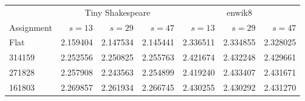\begin{tabular}{lrrr|rrr}
\toprule
 & \multicolumn{3}{c|}{Tiny Shakespeare} & \multicolumn{3}{c}{enwik8} \\
Assignment & $s=13$ & $s=29$ & $s=47$ & $s=13$ & $s=29$ & $s=47$ \\
\midrule
Flat \ilm{} & 2.159404 & 2.147534 & 2.145441 & 2.336511 & 2.334855 & 2.328025 \\
\midrule
314159 & 2.252556 & 2.250825 & 2.255763 & 2.421674 & 2.432248 & 2.429661 \\
271828 & 2.257908 & 2.243563 & 2.254899 & 2.419240 & 2.433407 & 2.431671 \\
161803 & 2.269857 & 2.261934 & 2.266745 & 2.430255 & 2.430292 & 2.431270 \\
\bottomrule
\end{tabular}
